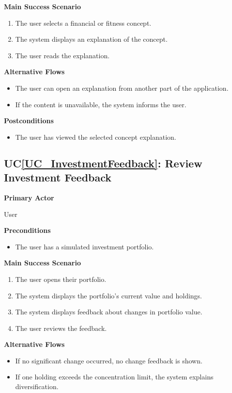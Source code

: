 \documentclass[12pt]{article}
\newcounter{ucnum} %
\newcommand{\ucref}[1]{UC\ref{#1}}
\begin{document}
\textbf{Main Success Scenario}
\begin{enumerate}
\item The user selects a financial or fitness concept.
\item The system displays an explanation of the concept.
\item The user reads the explanation.
\end{enumerate}

\textbf{Alternative Flows}
\begin{itemize}
\item The user can open an explanation from another part of the application.
\item If the content is unavailable, the system informs the user.
\end{itemize}

\textbf{Postconditions}
\begin{itemize}
\item The user has viewed the selected concept explanation.
\end{itemize}


\label{UC_InvestmentFeedback}
\subsection{\ucref{UC_InvestmentFeedback}: Review Investment Feedback}

\textbf{Primary Actor}

User

\textbf{Preconditions}
\begin{itemize}
\item The user has a simulated investment portfolio.
\end{itemize}

\textbf{Main Success Scenario}
\begin{enumerate}
\item The user opens their portfolio.
\item The system displays the portfolio's current value and holdings.
\item The system displays feedback about changes in portfolio value.
\item The user reviews the feedback.
\end{enumerate}

\textbf{Alternative Flows}
\begin{itemize}
\item If no significant change occurred, no change feedback is shown.
\item If one holding exceeds the concentration limit, the system explains diversification.
\end{itemize}
\end{document}

